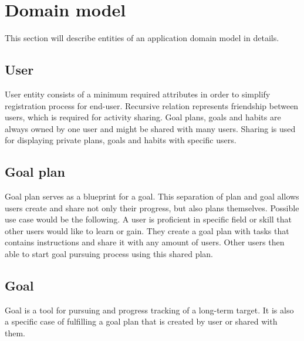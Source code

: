 
\section{Domain model}\label{sec:domain-model}

This section will describe entities of an application domain model in details.

\subsection{User}\label{subsec:user}

User entity consists of a minimum required attributes in order to simplify registration process for end-user.
Recursive relation represents friendship between users, which is required for activity sharing.
Goal plans, goals and habits are always owned by one user and might be shared with many users.
Sharing is used for displaying private plans, goals and habits with specific users.

\subsection{Goal plan}\label{subsec:goal-plan}

Goal plan serves as a blueprint for a goal.
This separation of plan and goal allows users create and share not only their progress, but also plans themselves.
Possible use case would be the following.
A user is proficient in specific field or skill that other users would like to learn or gain.
They create a goal plan with tasks that contains instructions and share it with any amount of users.
Other users then able to start goal pursuing process using this shared plan.

\subsection{Goal}\label{subsec:goal}

Goal is a tool for pursuing and progress tracking of a long-term target.
It is also a specific case of fulfilling a goal plan that is created by user or shared with them.


